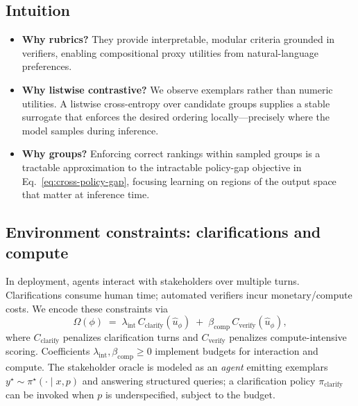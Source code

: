 \documentclass[sigconf]{acmart}
\begin{document}
\subsection{Intuition}\label{sec:intuition}

\begin{itemize}
    \item \textbf{Why rubrics?} They provide interpretable, modular criteria grounded in verifiers, enabling compositional proxy utilities from natural-language preferences.
    \item \textbf{Why listwise contrastive?} We observe exemplars rather than numeric utilities. A listwise cross-entropy over candidate groups supplies a stable surrogate that enforces the desired ordering locally—precisely where the model samples during inference.
    \item \textbf{Why groups?} Enforcing correct rankings within sampled groups is a tractable approximation to the intractable policy-gap objective in Eq.~\eqref{eq:cross-policy-gap}, focusing learning on regions of the output space that matter at inference time.
\end{itemize}


\subsection{Environment constraints: clarifications and compute}\label{sec:env}

In deployment, agents interact with stakeholders over multiple turns. Clarifications consume human time; automated verifiers incur monetary/compute costs. We encode these constraints via
\begin{equation}
\Omega(\phi) \;=\; 
\lambda_{\mathrm{int}}\, C_{\text{clarify}}(\hat u_\phi) 
\;+\; \beta_{\mathrm{comp}}\, C_{\text{verify}}(\hat u_\phi),
\end{equation}
where \(C_{\text{clarify}}\) penalizes clarification turns and \(C_{\text{verify}}\) penalizes compute-intensive scoring. Coefficients \(\lambda_{\mathrm{int}},\beta_{\mathrm{comp}}\ge 0\) implement budgets for interaction and compute. The stakeholder oracle is modeled as an \emph{agent} emitting exemplars \(y^\star\sim \pi^\star(\cdot\mid x,p)\) and answering structured queries; a clarification policy \(\pi_{\text{clarify}}\) can be invoked when \(p\) is underspecified, subject to the budget.
\end{document}
